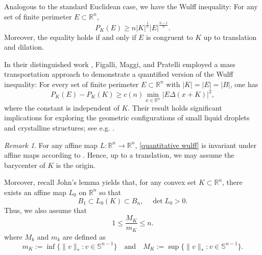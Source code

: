 \documentclass[reqno,11pt]{amsart}
\makeatletter
\numberwithin{equation}{section}
\theoremstyle{remark}
\newtheorem{rem}[thm]{Remark}%
\makeatother
\begin{document}
Analogous to the standard Euclidean case, we have the Wulff inequality: For any set of finite perimeter  $E\subset\mathbb R^n$, 
$$P_K(E)\ge n |K|^{\frac {1} n }|E|^{\frac {n-1}n}.  $$
Moreover, the equality holds if and only if $E$ is congruent to $K$ up to translation and dilation.

In their distinguished work \cite{FMP2010}, Figalli, Maggi, and Pratelli employed a mass transportation approach to demonstrate a quantified version of the Wulff inequality:  For every set  of finite perimeter $E\subset\mathbb R^n$ with $|K|=|E|=|B|$, one has 
\begin{equation}\label{quantitative wulff}
P_K(E) - P_K(K)\ge c(n) \min_{x\in \mathbb R^n} |E\Delta (x+K)|^2,
\end{equation} 
where the constant is independent of $K$. 
Their result holds significant implications for exploring the geometric configurations of small liquid droplets and crystalline structures; see e.g. \cite{FM2011, FZ2022}. 


\begin{rem}\label{affine invar}
   For any affine map $L:\mathbb R^n\to \mathbb R^n$, \eqref{quantitative wulff} is invariant under affine maps according to \cite[Step 2, Proof of Theorem 1.1]{FMP2010}. Hence, up to a translation, we may assume the barycenter of $K$ is the origin. 

   Moreover, recall  John's lemma  \cite[Theorem III]{J1948} yields that, for any convex set $K\subset\mathbb R^n$, there exists an affine map $L_0$ on $\mathbb R^n$ so that
  $$B_1\subset L_0(K)\subset B_n, \quad \det L_0>0. $$
Thus, we also assume that
\begin{equation}\label{mk control}
    1\le  \frac{M_K}{m_K}\le n.
\end{equation}
where $M_k$ and $m_k$ are defined as 
\begin{equation}\label{defi mk}
   m_K:=\inf\{\|v\|_*: v\in \mathbb S^{n-1}\}\quad \text{and} \quad M_K:=\sup\{\|v\|_*: v\in \mathbb S^{n-1}\}.
\end{equation}
\end{rem}

\medskip
\end{document}

